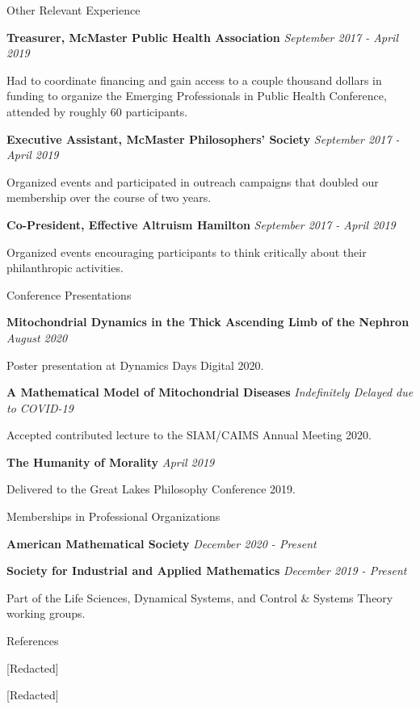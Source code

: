 \documentclass{resume} %
\begin{document}
\begin{rSection}{Other Relevant Experience}

{\bf Treasurer, McMaster Public Health Association} \hfill {\em September 2017 - April 2019}

Had to coordinate financing and gain access to a couple thousand dollars in funding to organize the Emerging Professionals in Public Health Conference, attended by roughly 60 participants.

{\bf Executive Assistant, McMaster Philosophers' Society} \hfill {\em September 2017 - April 2019}

Organized events and participated in outreach campaigns that doubled our membership over the course of two years.

{\bf Co-President, Effective Altruism Hamilton} \hfill {\em September 2017 - April 2019}

Organized events encouraging participants to think critically about their philanthropic activities.

\end{rSection}

\begin{rSection}{Conference Presentations}

{\bf Mitochondrial Dynamics in the Thick Ascending Limb of the Nephron} \hfill {\em August 2020}

Poster presentation at Dynamics Days Digital 2020.

{\bf A Mathematical Model of Mitochondrial Diseases} \hfill {\em Indefinitely Delayed due to COVID-19}

Accepted contributed lecture to the SIAM/CAIMS Annual Meeting 2020.

{\bf The Humanity of Morality} \hfill {\em April 2019}

Delivered to the Great Lakes Philosophy Conference 2019.

\end{rSection}

%
%
%
%

\begin{rSection}{Memberships in Professional Organizations}

{\bf American Mathematical Society} \hfill {\em December 2020 - Present}

{\bf Society for Industrial and Applied Mathematics} \hfill {\em December 2019 - Present}

Part of the Life Sciences, Dynamical Systems, and Control \& Systems Theory working groups.

\end{rSection}

\begin{rSection}{References}

[Redacted]

[Redacted]

\end{rSection}
\end{document}
